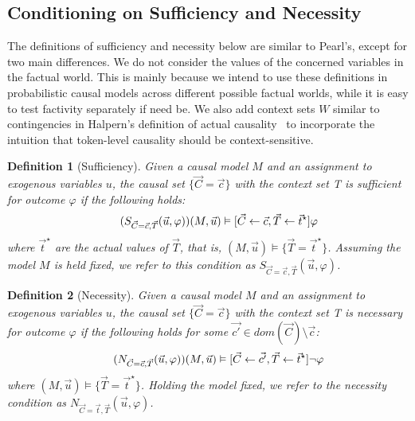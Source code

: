 \documentclass{article}
\newtheorem{definition}{Definition}
\begin{document}
\subsection{Conditioning on Sufficiency and Necessity}


The definitions of sufficiency and necessity below are similar to Pearl's, except for two main differences. We do not consider the values of the concerned variables in the factual world. This is mainly because we intend to use these definitions in probabilistic causal models across different possible factual worlds, while it is easy to test factivity separately if need be. We also add context sets $W$ similar to contingencies in Halpern's definition of actual causality~\cite{actualCausalityHalpern} to incorporate the intuition that token-level causality should be context-sensitive.




\begin{definition}[Sufficiency]
    Given a causal model \(M\) and an assignment to exogenous variables \(u\), the causal set \(\{\vec{C} = \vec{c}\}\) with the context set T is \textit{sufficient} for outcome \(\varphi\) if the following holds:
    \begin{align}
    \tag{$S_{\vec{C} = \vec{c}, \vec{T}}(\vec{u}, \varphi)$}
    (M, \vec{u}) 
    \vDash [\vec{C} \leftarrow \vec{c}, \vec{T} \leftarrow \vec{t}^\star]\varphi
    \end{align}
     where $\vec{t}^\star$ are the actual values of $\vec{T}$, that is, \((M, \vec{u}) \vDash \{\vec{T} = \vec{t}^\star\}\). Assuming the model $M$ is held fixed,  we refer to this condition as \(S_{\vec{C} = \vec{c}, \vec{T}}(\vec{u}, \varphi)\).

\end{definition}

\begin{definition}[Necessity]
    Given a causal model \(M\) and an assignment to exogenous variables \(u\), the causal set \(\{\vec{C} = \vec{c}\}\) with the context set T is \textit{necessary} for outcome \(\varphi\) if the following holds for some  \(\vec{c'} \in \mathit{dom}(\vec{C})\setminus \vec{c}\):
    \begin{align} \label{eq:nec}
        \tag{\(N_{\vec{C} = \vec{c}, \vec{T}}(\vec{u}, \varphi)\)}
    (M, \vec{u}) \vDash [\vec{C} \leftarrow \vec{c'}, \vec{T} \leftarrow \vec{t}^\star]\neg \varphi\end{align}
    where \((M, \vec{u}) \vDash \{\vec{T} = \vec{t}^\star\}\).
    Holding the model fixed, we refer to the necessity condition as \(N_{\vec{C} = \vec{t}, \vec{T}}(\vec{u}, \varphi)\).
\end{definition}
\end{document}
